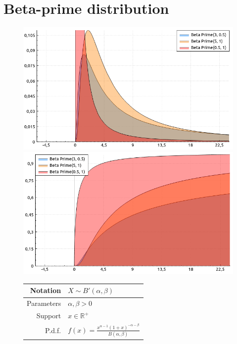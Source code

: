 \documentclass[a4paper,11pt]{article}
\theoremstyle{plain}
\theoremstyle{definition}
\newcommand{\MR}{\mathbb{R}}
\begin{document}
	\section{Beta-prime distribution}
		\begin{figure}[!htb]\centering
		\begin{minipage}{0.55\textwidth}
			\includegraphics[width=\linewidth, right]{beta_prime_pdf}
			\captionsetup{labelformat=empty}
			\includegraphics[width=\linewidth, right]{beta_prime_cdf}
			\captionsetup{labelformat=empty}
		\end{minipage}
		\begin{minipage}{0.4\textwidth}
			\begin{tabular}{| r | l |}
				\hline
				Notation & $X \sim B'(\alpha, \beta)$ \\
				\hline
				Parameters & $\alpha, \beta > 0$ \\
				\hline
				Support & $x \in \MR^+$  \\
				\hline
				P.d.f. & $f(x) = \frac{x^{\alpha - 1}(1 + x)^{-\alpha - \beta}}{B(\alpha, \beta)}$ \\

\end{tabular}
\end{minipage}
\end{figure}
\end{document}
